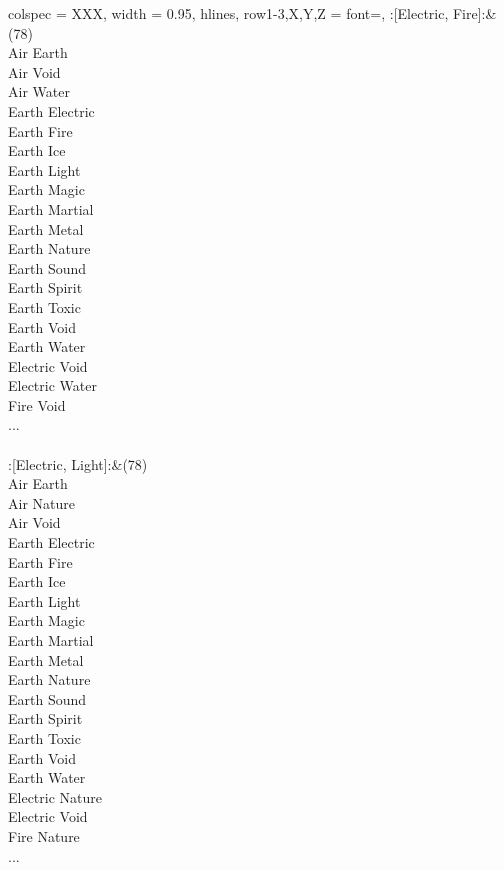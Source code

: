 \begin{longtblr}[
	caption = {2v2 Defending Weak},
	label = {2v2-Defending-Weak},
]{
	colspec = {XXX}, width = 0.95\linewidth,
	hlines,
	row{1-3,X,Y,Z} = {font=\bfseries},
}
	:[Electric, Fire]:&{(78)\\
	Air Earth \\
	Air Void \\
	Air Water \\
	Earth Electric \\
	Earth Fire \\
	Earth Ice \\
	Earth Light \\
	Earth Magic \\
	Earth Martial \\
	Earth Metal \\
	Earth Nature \\
	Earth Sound \\
	Earth Spirit \\
	Earth Toxic \\
	Earth Void \\
	Earth Water \\
	Electric Void \\
	Electric Water \\
	Fire Void \\
	...\\
	}\\

	:[Electric, Light]:&{(78)\\
	Air Earth \\
	Air Nature \\
	Air Void \\
	Earth Electric \\
	Earth Fire \\
	Earth Ice \\
	Earth Light \\
	Earth Magic \\
	Earth Martial \\
	Earth Metal \\
	Earth Nature \\
	Earth Sound \\
	Earth Spirit \\
	Earth Toxic \\
	Earth Void \\
	Earth Water \\
	Electric Nature \\
	Electric Void \\
	Fire Nature \\
	...\\
	}\\


\end{longtblr}
